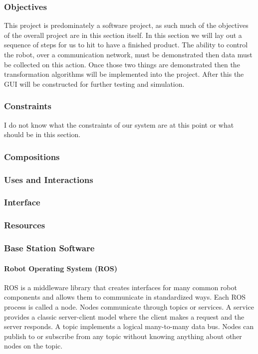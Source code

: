 \documentclass[english,12pt]{article}
\begin{document}
\subsubsection{Objectives}
This project is predominately a software project, as such much of the objectives of the overall project 
are in this section itself. In this section we will lay out a sequence of steps for us to hit to have a 
finished product. The ability to control the robot, over a communication network, must be demonstrated 
then data must be collected on this action. Once those two things are demonstrated then the transformation 
algorithms will be implemented into the project. After this the GUI will be constructed for further 
testing and simulation.
\subsubsection{Constraints}
I do not know what the constraints of our system are at this point or what should be in this
section.
\subsubsection{Compositions}
\subsubsection{Uses and Interactions}
\subsubsection{Interface}
\subsubsection{Resources}
\subsubsection{Base Station Software}
\paragraph{Robot Operating System (ROS)}
ROS is a middleware library that creates interfaces for many common robot components and allows
them to communicate in standardized ways. Each ROS process is called a node. Nodes communicate
through topics or services. A service provides a classic server-client model where the client makes a
request and the server responds. A topic implements a logical many-to-many data bus. Nodes can
publish to or subscribe from any topic without knowing anything about other nodes on the topic.
\end{document}
